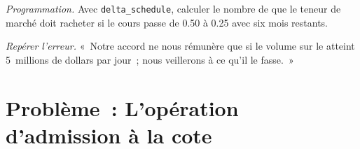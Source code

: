 \begin{exercise}[$\star\star\star$]\label{exo:m3:the-crypto-trading-business:7}
\emph{Programmation.} Avec \texttt{delta\_schedule}, calculer le nombre de  que le teneur de marché doit racheter si le cours passe de 0.50 à 0.25 avec six mois restants.
\end{exercise}

\begin{exercise}[$\star\star\star$]\label{exo:m3:the-crypto-trading-business:8}
\emph{Repérer l'erreur.} «~Notre accord ne nous rémunère que si le volume sur le  atteint 5~millions de dollars par jour~; nous veillerons à ce qu'il le fasse.~»
\end{exercise}

\section{Problème~: L'opération d'admission à la cote}

